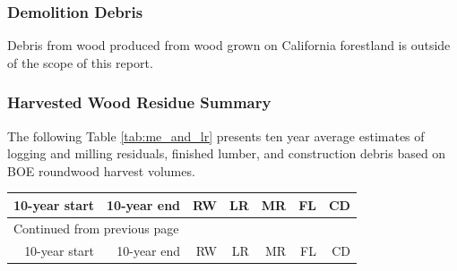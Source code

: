 \documentclass[a4paper]{article}
\begin{document}
\subsubsection{Demolition Debris}
\label{sec:orgheadline13}
Debris from wood produced from wood grown on California forestland is outside of the scope of this report.

\subsubsection{Harvested Wood Residue Summary}
\label{sec:orgheadline14}
The following Table \ref{tab:me_and_lr} presents ten year average estimates of logging and milling residuals, finished lumber, and construction debris based on \ac{BOE} roundwood harvest volumes.

\begin{longtable}{rrrrrrr}
10-year start & 10-year end & RW & LR & MR & FL & CD\\
\hline
\endfirsthead
\multicolumn{7}{l}{Continued from previous page} \\
\hline

10-year start & 10-year end & RW & LR & MR & FL & CD \\


\end{longtable}
\end{document}
